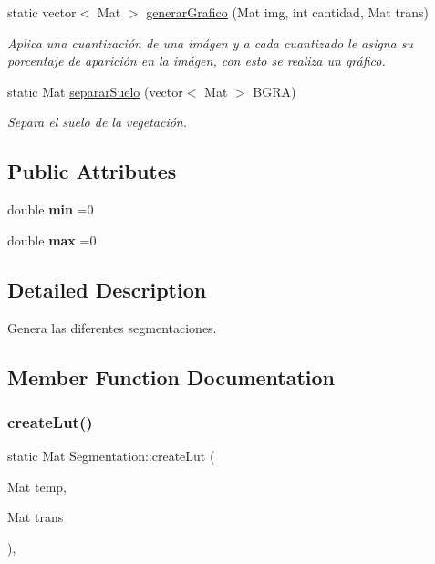 \begin{DoxyCompactItemize}
static vector$<$ Mat $>$ \mbox{\hyperlink{classSegmentation_a83c50607e87525469ce7876894e5f5ab}{generar\+Grafico}} (Mat img, int cantidad, Mat trans)
\begin{DoxyCompactList}\small\item\em Aplica una cuantización de una imágen y a cada cuantizado le asigna su porcentaje de aparición en la imágen, con esto se realiza un gráfico. \end{DoxyCompactList}\item 
static Mat \mbox{\hyperlink{classSegmentation_abe304fc9d6a13f16927ae7682f90b540}{separar\+Suelo}} (vector$<$ Mat $>$ B\+G\+RA)
\begin{DoxyCompactList}\small\item\em Separa el suelo de la vegetación. \end{DoxyCompactList}\end{DoxyCompactItemize}
\subsection*{Public Attributes}
\begin{DoxyCompactItemize}
\item 
\mbox{\label{classSegmentation_a9eb5fd1fcc0bbac6ed405b5907461918}} 
double {\bfseries min} =0
\item 
\mbox{\label{classSegmentation_ad885b287f4bedc6a72725c9ea3318bcf}} 
double {\bfseries max} =0
\end{DoxyCompactItemize}


\subsection{Detailed Description}
Genera las diferentes segmentaciones. 

\subsection{Member Function Documentation}
\mbox{\label{classSegmentation_aa15a21553b49e70fc2ee5a3be3ff9695}} 
\subsubsection{\texorpdfstring{create\+Lut()}{createLut()}}
{\footnotesize\ttfamily static Mat Segmentation\+::create\+Lut (\begin{DoxyParamCaption}\item[{Mat}]{temp,  }\item[{Mat}]{trans }\end{DoxyParamCaption})\hspace{0.3cm}{\ttfamily [inline]}, {\ttfamily [static]}}



